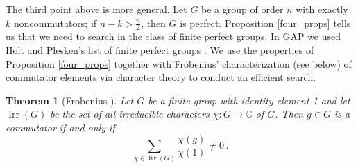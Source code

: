 \documentclass[10pt,leqno]{amsart}
\newtheorem{theorem}{Theorem}[]
\begin{document}
The third point above is more general. Let $G$ be a group of order $n$ with exactly $k$ noncommutators; if $n-k>\frac{n}{2}$, then $G$ is perfect.  Proposition \ref{four_props} tells us that we need to search in the class of finite perfect groups. In GAP we used Holt and Plesken's list of finite perfect groups \cite{holtplesken}. We use the properties of Proposition \ref{four_props} together with Frobenius' characterization (see below) of commutator elements via character theory to conduct an efficient search.

\begin{theorem}[Frobenius \cite{Frobenius1896}]
Let $G$ be a finite group with identity element 1 and let $\operatorname{Irr}(G)$ be the set of all irreducible characters $\chi:G\to \mathbb{C}$ of $G$. Then $g\in G$ is a commutator if and only if 
\[
    \sum_{\chi \in \operatorname{Irr}(G)} \frac{\chi(g)}{\chi(1)} \neq 0\,.
    \label{comm_criterion}
\]
\end{theorem}
\end{document}
